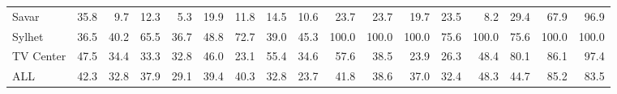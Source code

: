 \begin{table}
\begin{tabular}{lrrrrrrrrrrrrrrrr}
Savar & 35.8 & 9.7 & 12.3 & 5.3 & 19.9 & 11.8 & 14.5 & 10.6 & 23.7 & 23.7 & 19.7 & 23.5 & 8.2 & 29.4 & 67.9 & 96.9 \\
Sylhet & 36.5 & 40.2 & 65.5 & 36.7 & 48.8 & 72.7 & 39.0 & 45.3 & 100.0 & 100.0 & 100.0 & 75.6 & 100.0 & 75.6 & 100.0 & 100.0 \\
TV Center & 47.5 & 34.4 & 33.3 & 32.8 & 46.0 & 23.1 & 55.4 & 34.6 & 57.6 & 38.5 & 23.9 & 26.3 & 48.4 & 80.1 & 86.1 & 97.4 \\
ALL & 42.3 & 32.8 & 37.9 & 29.1 & 39.4 & 40.3 & 32.8 & 23.7 & 41.8 & 38.6 & 37.0 & 32.4 & 48.3 & 44.7 & 85.2 & 83.5 \\
\bottomrule
\end{tabular}
\end{table}
